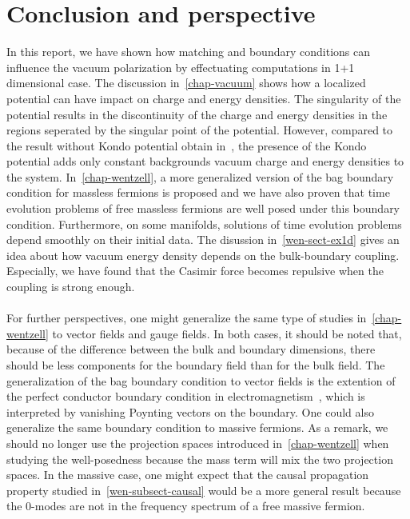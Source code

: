 \chapter{Conclusion and perspective}
In this report, we have shown how matching and boundary conditions can influence the vacuum polarization by effectuating computations in 1+1 dimensional case. 
The discussion in~\cref{chap-vacuum} shows how a localized  potential can have impact on charge and energy densities.
The singularity of the potential results in the discontinuity of the charge and energy densities in the regions seperated by the singular point of the potential.
However, compared to the result without Kondo potential obtain in~\cite{Zahn2015}, the presence of the Kondo potential adds only constant backgrounds vacuum charge and energy densities to the system. 
In~\cref{chap-wentzell}, a more generalized version of the bag boundary condition for massless fermions is proposed and we have also proven that time evolution problems of free massless fermions are well posed under this boundary condition.
Furthermore, on some manifolds, solutions of time evolution problems depend smoothly on their initial data.
The disussion in~\cref{wen-sect-ex1d} gives an idea about how vacuum energy density depends on the bulk-boundary coupling.
Especially, we have found that the Casimir force becomes repulsive when the coupling is strong enough.
\\\\
For further perspectives, 
one might generalize the same type of studies in~\cref{chap-wentzell} to vector fields and gauge fields.
In both cases, it should be noted that, because of the difference between the bulk and boundary dimensions, 
there should be less components for the boundary field than for the bulk field.
The generalization of the bag boundary condition to vector fields is the extention of the perfect conductor boundary condition in electromagnetism~\cite{Stokes2015}, 
which is interpreted by vanishing Poynting vectors on the boundary.
One could also generalize the same boundary condition to massive fermions. 
As a remark, 
we should no longer use the projection spaces introduced in~\cref{chap-wentzell} when studying the well-posedness because the mass term will mix the two projection spaces.
In the massive case, one might expect that the causal propagation property studied in~\cref{wen-subsect-causal} would be a more general result because the 0-modes are not in the frequency spectrum of a free massive fermion. 




